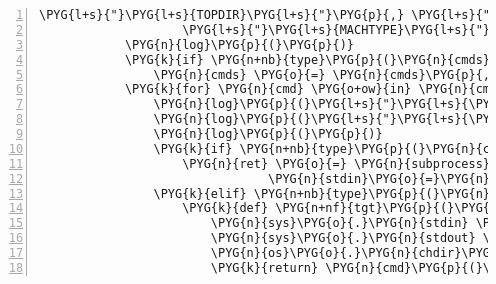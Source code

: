 \begin{Verbatim}[commandchars=\\\{\},numbers=left,firstnumber=1,stepnumber=5]
                    \PYG{l+s}{"}\PYG{l+s}{TOPDIR}\PYG{l+s}{"}\PYG{p}{,} \PYG{l+s}{"}\PYG{l+s}{PREFIX}\PYG{l+s}{"}\PYG{p}{,} \PYG{l+s}{"}\PYG{l+s}{BINDIR}\PYG{l+s}{"}\PYG{p}{,} \PYG{l+s}{"}\PYG{l+s}{LIBDIR}\PYG{l+s}{"}\PYG{p}{,}
                    \PYG{l+s}{"}\PYG{l+s}{MACHTYPE}\PYG{l+s}{"}\PYG{p}{,} \PYG{l+s}{"}\PYG{l+s}{NCPUS\PYGZus{}ONLN}\PYG{l+s}{"}\PYG{p}{)}\PYG{p}{,} \PYG{n}{env}\PYG{o}{.}\PYG{n}{iteritems}\PYG{p}{(}\PYG{p}{)}\PYG{p}{)}\PYG{p}{)}\PYG{p}{)}
            \PYG{n}{log}\PYG{p}{(}\PYG{p}{)}
            \PYG{k}{if} \PYG{n+nb}{type}\PYG{p}{(}\PYG{n}{cmds}\PYG{p}{)} \PYG{o+ow}{not} \PYG{o+ow}{in} \PYG{p}{(}\PYG{n+nb}{list}\PYG{p}{,} \PYG{n+nb}{tuple}\PYG{p}{)}\PYG{p}{:}
                \PYG{n}{cmds} \PYG{o}{=} \PYG{n}{cmds}\PYG{p}{,} \PYG{c}{\PYGZsh{} make it a 1-tuple}
            \PYG{k}{for} \PYG{n}{cmd} \PYG{o+ow}{in} \PYG{n}{cmds}\PYG{p}{:}
                \PYG{n}{log}\PYG{p}{(}\PYG{l+s}{"}\PYG{l+s}{\PYGZdl{} cd }\PYG{l+s}{"} \PYG{o}{+} \PYG{n+nb+bp}{self}\PYG{o}{.}\PYG{n}{subdir}\PYG{p}{)}
                \PYG{n}{log}\PYG{p}{(}\PYG{l+s}{"}\PYG{l+s}{\PYGZdl{} }\PYG{l+s}{"} \PYG{o}{+} \PYG{l+s}{"}\PYG{l+s+se}{\PYGZbs{}n}\PYG{l+s}{  }\PYG{l+s}{"}\PYG{o}{.}\PYG{n}{join}\PYG{p}{(}\PYG{n+nb}{str}\PYG{p}{(}\PYG{n}{cmd}\PYG{p}{)}\PYG{o}{.}\PYG{n}{split}\PYG{p}{(}\PYG{l+s}{"}\PYG{l+s+se}{\PYGZbs{}n}\PYG{l+s}{"}\PYG{p}{)}\PYG{p}{)}\PYG{p}{)}
                \PYG{n}{log}\PYG{p}{(}\PYG{p}{)}
                \PYG{k}{if} \PYG{n+nb}{type}\PYG{p}{(}\PYG{n}{cmd}\PYG{p}{)} \PYG{o}{==} \PYG{n+nb}{str}\PYG{p}{:}
                    \PYG{n}{ret} \PYG{o}{=} \PYG{n}{subprocess}\PYG{o}{.}\PYG{n}{call}\PYG{p}{(}\PYG{n}{cmd}\PYG{p}{,} \PYG{n}{shell}\PYG{o}{=}\PYG{n+nb+bp}{True}\PYG{p}{,} \PYG{n}{cwd}\PYG{o}{=}\PYG{n+nb+bp}{self}\PYG{o}{.}\PYG{n}{subdir}\PYG{p}{,}
                                \PYG{n}{stdin}\PYG{o}{=}\PYG{n}{dev\PYGZus{}null}\PYG{p}{,} \PYG{n}{stdout}\PYG{o}{=}\PYG{n}{T}\PYG{o}{.}\PYG{n}{stdin}\PYG{p}{,} \PYG{n}{stderr}\PYG{o}{=}\PYG{n}{T}\PYG{o}{.}\PYG{n}{stdin}\PYG{p}{)}
                \PYG{k}{elif} \PYG{n+nb}{type}\PYG{p}{(}\PYG{n}{cmd}\PYG{p}{)} \PYG{o}{==} \PYG{n}{MethodType}\PYG{p}{:}
                    \PYG{k}{def} \PYG{n+nf}{tgt}\PYG{p}{(}\PYG{p}{)}\PYG{p}{:}
                        \PYG{n}{sys}\PYG{o}{.}\PYG{n}{stdin} \PYG{o}{=} \PYG{n}{dev\PYGZus{}null}
                        \PYG{n}{sys}\PYG{o}{.}\PYG{n}{stdout} \PYG{o}{=} \PYG{n}{sys}\PYG{o}{.}\PYG{n}{stderr} \PYG{o}{=} \PYG{n}{T}\PYG{o}{.}\PYG{n}{stdin}
                        \PYG{n}{os}\PYG{o}{.}\PYG{n}{chdir}\PYG{p}{(}\PYG{n+nb+bp}{self}\PYG{o}{.}\PYG{n}{subdir}\PYG{p}{)}
                        \PYG{k}{return} \PYG{n}{cmd}\PYG{p}{(}\PYG{p}{)}

\end{Verbatim}
